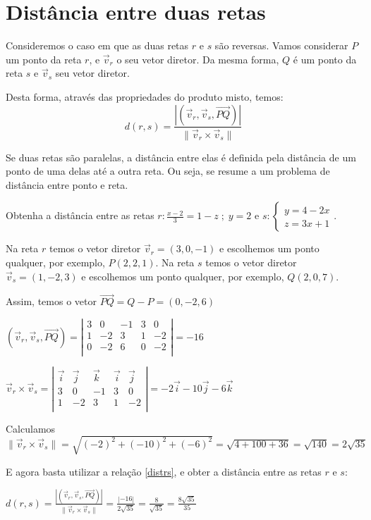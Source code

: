 \section{Distância entre duas retas}

Consideremos o caso em que as duas retas $r$ e $s$ são reversas. Vamos considerar $P$ um ponto da reta $r$, e $\vec{v}_r$ o seu vetor diretor. Da mesma forma, $Q$ é um ponto da reta $s$ e $\vec{v}_s$ seu vetor diretor.

Desta forma, através das propriedades do produto misto, temos:
\begin{equation}
d(r, s)=\frac{|(\vec{v}_r, \vec{v}_s, \overrightarrow{PQ})|}{\| \vec{v}_r \times \vec{v}_s \|} \label{distrs}
\end{equation}

Se duas retas são paralelas, a distância entre elas é definida pela distância de um ponto de uma delas até a outra reta. Ou seja, se resume a um problema de distância entre ponto e reta.

\begin{exemplo} Obtenha a distância entre as retas $\displaystyle r: \frac{x-2}{3}=1-z \; ; \; y=2$ e $s:\left\{ \begin{array}{l}
y=4-2x\\
z=3x+1 \end{array} \right. $.

Na reta $r$ temos o vetor diretor $\vec{v}_r=(3,0,-1)$ e escolhemos um ponto qualquer, por exemplo, $P(2,2,1)$. Na reta $s$ temos o vetor diretor $\vec{v}_s=(1,-2,3)$ e escolhemos um ponto qualquer, por exemplo, $Q(2,0,7)$.

Assim, temos o vetor $\overrightarrow{PQ}=Q-P=(0,-2,6)$

$(\vec{v}_r, \vec{v}_s, \overrightarrow{PQ})= \left|
\begin{array}{ccc|cc}
3 & 0 & -1 & 3 & 0 \\
1 & -2 & 3 &1 & -2 \\
0 & -2 & 6 &0 & -2 \\
\end{array}
\right|= -16
$

$\vec{v}_r \times \vec{v}_s= \left|
\begin{array}{ccc|cc}
\vec i & \vec j & \vec k & \vec i & \vec j \\
3 & 0 & -1 & 3 & 0 \\
1 & -2 & 3 &1 & -2 \\
\end{array}
\right|= -2\vec{i} -10\vec{j} -6\vec{k}
$

Calculamos $\|\vec{v}_r \times \vec{v}_s\|=\sqrt{(-2)^2+(-10)^2+(-6)^2}=\sqrt{4+100+36}=\sqrt{140}=2\sqrt{35}$

E agora basta utilizar a relação \ref{distrs}, e obter a distância entre as retas $r$ e $s$:

$ d(r, s)=\frac{|(\vec{v}_r, \vec{v}_s, \overrightarrow{PQ})|}{\| \vec{v}_r \times \vec{v}_s \|}=\frac{|-16|}{2\sqrt{35}}=\frac{8}{\sqrt{35}}=\frac{8\sqrt{35}}{35}$

\end{exemplo}

